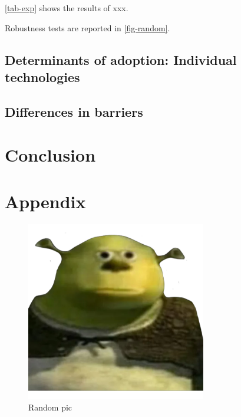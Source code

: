 \documentclass[a4paper,11pt]{article}
\begin{document}
	

\autoref{tab-exp} shows the results of xxx. 

Robustness tests are reported in \autoref{fig-random}.

\subsection{Determinants of adoption: Individual technologies}\label{res-ind}

\subsection{Differences in barriers}\label{res-diff}

\section{Conclusion}\label{conclu}

\newpage




\newpage

\section*{Appendix}\label{appA}

\setcounter{table}{0}
\renewcommand{\thetable}{A\arabic{table}}
\setcounter{figure}{0}
\renewcommand{\thefigure}{A\arabic{figure}}

\begin{figure}[h]
	\centering
	\includegraphics[width=0.7\textwidth]{fig-random.png}
	\caption{Random pic}
	\label{fig-random}
\end{figure}

%


%
%
\end{document}
